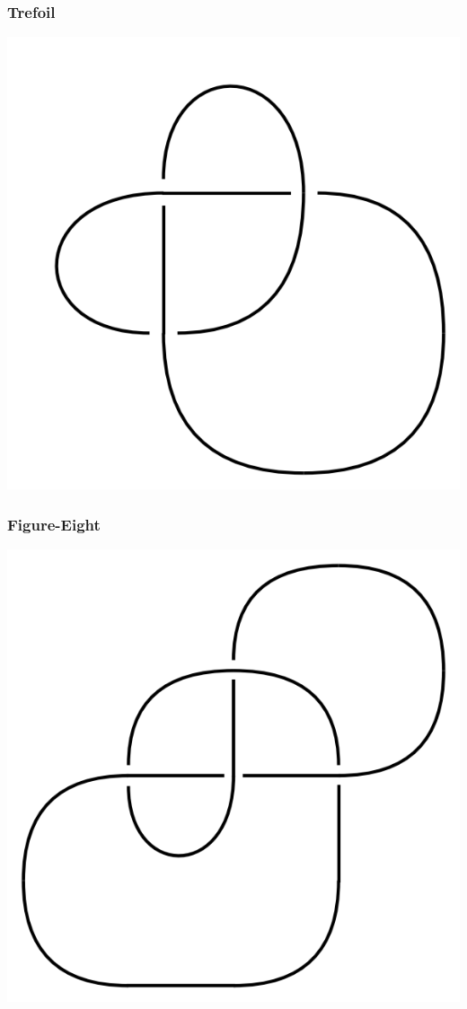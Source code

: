 \documentclass{beamer}
\begin{document}
\begin{frame}
  \frametitle{Trefoil}
  \begin{center}
    \includegraphics[scale=.4]{trefoil}    
  \end{center}
\end{frame}

\begin{frame}
  \frametitle{Figure-Eight}
  \begin{center}
    \includegraphics[scale=.4]{figure-eight}
  \end{center}
\end{frame}
\end{document}
